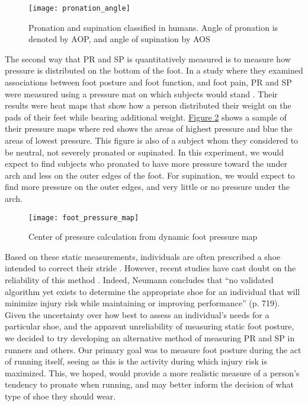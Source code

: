 \begin{figure}[h]
  \centering
  \texttt{[image: pronation\_angle]}
  \caption[Pronation angle]{Pronation and supination classified in humans. Angle of pronation is denoted by AOP, and angle of supination by AOS \parencite{erickson}}
  \label{fig:x AOP}
\end{figure}

The second way that PR and SP is quantitatively measured is to measure how pressure is distributed on the bottom of the foot.
In a study where they examined associations between foot posture and foot function, and foot pain, PR and SP were measured using a pressure mat on which subjects would stand \parencite{menz}.
Their results were heat maps that show how a person distributed their weight on the pads of their feet while bearing additional weight.
\hyperref[{fig:x press. map}]{Figure \ref*{fig:x press. map}} shows a sample of their pressure maps where red shows the areas of highest pressure and blue the areas of lowest pressure.
This figure is also of a subject whom they considered to be neutral, not severely pronated or supinated.
In this experiment, we would expect to find subjects who pronated to have more pressure toward the under arch and less on the outer edges of the foot.
For supination, we would expect to find more pressure on the outer edges, and very little or no pressure under the arch.\par

\begin{figure}[h]
  \centering
  \texttt{[image: foot\_pressure\_map]}
  \caption[Foot pressure map]{Center of pressure calculation from dynamic foot pressure map \parencite{menz}}
  \label{fig:x press. map}
\end{figure}

Based on these static measurements, individuals are often prescribed a shoe intended to correct their stride \parencite{neumann}.
However, recent studies have cast doubt on the reliability of this method \parencite{richards}.
Indeed, Neumann concludes that “no validated algorithm yet exists to determine the appropriate shoe for an individual that will minimize injury risk while maintaining or improving performance” (p. 719).
Given the uncertainty over how best to assess an individual’s needs for a particular shoe, and the apparent unreliability of measuring static foot posture, we decided to try developing an alternative method of measuring PR and SP in runners and others.
Our primary goal was to measure foot posture during the act of running itself, seeing as this is the activity during which injury risk is maximized.
This, we hoped, would provide a more realistic measure of a person’s tendency to pronate when running, and may better inform the decision of what type of shoe they should wear.\par

